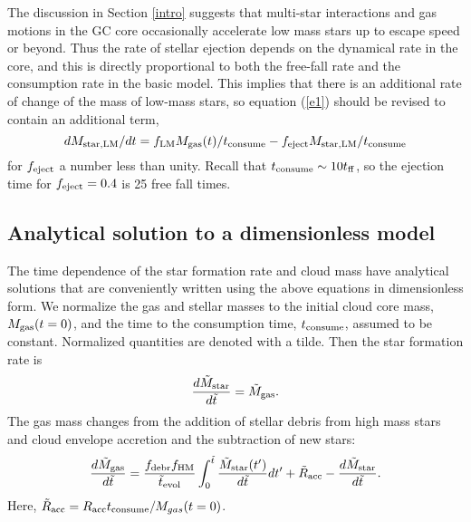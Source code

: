 \documentclass[12pt,preprint]{aastex}
\begin{document}
The discussion in Section \ref{intro} suggests that multi-star interactions and gas
motions in the GC core occasionally accelerate low mass stars up to escape speed or
beyond. Thus the rate of stellar ejection depends on the dynamical rate in the
core, and this is directly proportional to both the free-fall rate and the
consumption rate in the basic model. This implies that there is an additional rate
of change of the mass of low-mass stars, so equation (\ref{e1}) should be revised
to contain an additional term,
\begin{equation}
dM_{\rm star,LM}/dt= f_{\rm LM} M_{\rm gas}(t)/t_{\rm consume}-
f_{\rm eject} M_{\rm star,LM}/t_{\rm consume}
\label{eject}
\end{equation}
for $f_{\rm eject}$ a number less than unity. Recall that $t_{\rm
consume}\sim10t_{\rm ff}$, so the ejection time for $f_{\rm eject}=0.4$ is 25 free
fall times.

\subsection{Analytical solution to a dimensionless model}
\label{analyticalsol}

The time dependence of the star formation rate and cloud mass have analytical
solutions that are conveniently written using the above equations in dimensionless
form. We normalize the gas and stellar masses to the initial cloud core mass,
$M_{\rm gas}(t=0)$, and the time to the consumption time, $t_{\rm consume}$,
assumed to be constant. Normalized quantities are denoted with a tilde. Then the
star formation rate is
\begin{equation}
{{d{\tilde M}_{\rm star}}\over{d{\tilde t}}}={\tilde M}_{\rm gas}.
\label{dless1}
\end{equation}
The gas mass changes from the addition of stellar debris from high mass stars and
cloud envelope accretion and the subtraction of new stars:
\begin{equation}
{{d{\tilde M}_{\rm gas}}\over{d{\tilde t}}}={{f_{\rm debr}f_{\rm HM}}\over{{\tilde t}_{\rm evol}}}
\int_0^{\tilde t} {{{\tilde M}_{\rm star}(t^\prime)}\over{d{\tilde t}}}dt^\prime + {\tilde R}_{\rm acc}
-{{d{\tilde M}_{\rm star}}\over{d{\tilde t}}}.
\label{dless2}
\end{equation}
Here, ${\tilde R}_{\rm acc}=R_{\rm acc}t_{\rm consume}/M_{gas}(t=0)$.
\end{document}
